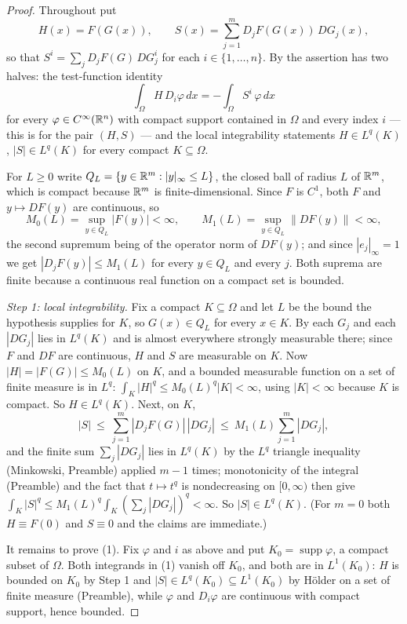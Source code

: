 \begin{proof}
Throughout put
\[
H(x)=F(G(x)),\qquad
S(x)=\sum_{j=1}^m D_jF(G(x))\,DG_j(x),
\]
so that $S^i=\sum_jD_jF(G)\,DG_j^i$ for each $i\in\{1,\dots,n\}$.  By
 the assertion has two halves: the test-function identity
\[
\int_\Omega H\,D_i\varphi\,dx=-\int_\Omega S^i\,\varphi\,dx
\tag{1}
\]
for every $\varphi\in C^\infty(\mathbb{R}^n)$ with compact support contained in
$\Omega$ and every index $i$ --- this is  for the
pair $(H,S)$ --- and the local integrability statements $H\in L^q(K)$,
$|S|\in L^q(K)$ for every compact $K\subseteq\Omega$.

For $L\ge0$ write $Q_L=\{y\in\mathbb{R}^m:|y|_\infty\le L\}$, the closed ball of radius
$L$ of $\mathbb{R}^m$, which is compact because $\mathbb{R}^m$ is finite-dimensional.  Since
$F$ is $C^1$, both $F$ and $y\mapsto DF(y)$ are continuous, so
\[
M_0(L)=\sup_{y\in Q_L}|F(y)|<\infty,
\qquad
M_1(L)=\sup_{y\in Q_L}\|DF(y)\|<\infty ,
\]
the second supremum being of the operator norm of $DF(y)$; and since
$|e_j|_\infty=1$ we get $|D_jF(y)|\le M_1(L)$ for every $y\in Q_L$ and every
$j$.  Both suprema are finite because a continuous real function on a compact
set is bounded.

\emph{Step 1: local integrability.}  Fix a compact $K\subseteq\Omega$ and let
$L$ be the bound the hypothesis supplies for $K$, so $G(x)\in Q_L$ for every
$x\in K$.  By  each $G_j$ and each $|DG_j|$ lies in
$L^q(K)$ and is almost everywhere strongly measurable there; since $F$ and $DF$
are continuous, $H$ and $S$ are measurable on $K$.  Now
$|H|=|F(G)|\le M_0(L)$ on $K$, and a bounded measurable function on a set of
finite measure is in $L^q$: $\int_K|H|^q\le M_0(L)^q|K|<\infty$, using
$|K|<\infty$ because $K$ is compact.  So $H\in L^q(K)$.  Next, on $K$,
\[
|S|\ \le\ \sum_{j=1}^m|D_jF(G)|\,|DG_j|\ \le\ M_1(L)\sum_{j=1}^m|DG_j| ,
\]
and the finite sum $\sum_j|DG_j|$ lies in $L^q(K)$ by the $L^q$ triangle
inequality (Minkowski, Preamble) applied $m-1$ times; monotonicity of the
integral (Preamble) and the fact that $t\mapsto t^q$ is nondecreasing on
$[0,\infty)$ then give $\int_K|S|^q\le M_1(L)^q\int_K(\sum_j|DG_j|)^q<\infty$.
So $|S|\in L^q(K)$.  (For $m=0$ both $H\equiv F(0)$ and $S\equiv0$ and the
claims are immediate.)

It remains to prove (1).  Fix $\varphi$ and $i$ as above and put
$K_0=\operatorname{supp}\varphi$, a compact subset of $\Omega$.  Both
integrands in (1) vanish off $K_0$, and both are in $L^1(K_0)$: $H$ is bounded
on $K_0$ by Step 1 and $|S|\in L^q(K_0)\subseteq L^1(K_0)$ by H\"older on a set
of finite measure (Preamble), while $\varphi$ and $D_i\varphi$ are continuous
with compact support, hence bounded.


\end{proof}
